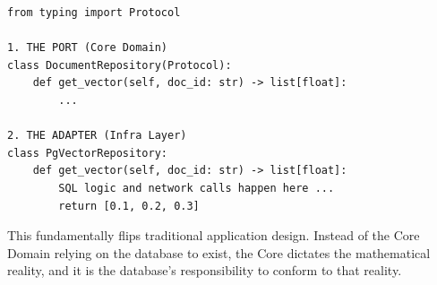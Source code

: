 \begin{lstlisting}[caption={Dependency Inversion using Python Protocols}]
from typing import Protocol

1. THE PORT (Core Domain)
class DocumentRepository(Protocol):
    def get_vector(self, doc_id: str) -> list[float]:
        ...

2. THE ADAPTER (Infra Layer)
class PgVectorRepository:
    def get_vector(self, doc_id: str) -> list[float]:
        SQL logic and network calls happen here ...
        return [0.1, 0.2, 0.3]
\end{lstlisting}

This fundamentally flips traditional application design. Instead of the Core Domain relying on the database to exist, the Core dictates the mathematical reality, and it is the database's responsibility to conform to that reality.


